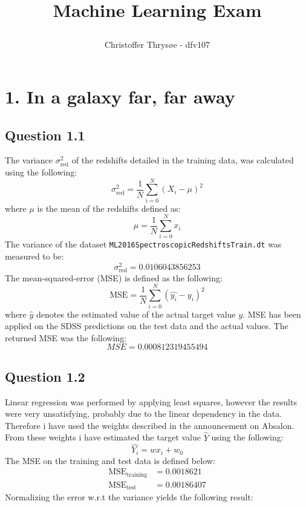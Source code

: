 \documentclass{article}
\title{
\vspace{1in}
\textmd{\textbf{Machine Learning Exam}} \\
\author{Christoffer Thrysøe - dfv107}
}
\begin{document}
\maketitle
{}
\section{1. In a galaxy far, far away}
\subsection{Question 1.1}
The variance $\sigma^ 2_{\text{red}}$ of the redshifts detailed in the training data, was calculated using the following:
\begin{equation}
\sigma^2_{\text{red}} = \dfrac{1}{N} \sum\limits_{i=0}^N(X_i-\mu)^2
\end{equation}
where $\mu$ is the mean of the redshifts defined as:
\begin{equation}
\mu = \dfrac{1}{N} \sum\limits_{i=0}^N x_i
\end{equation}
The variance of the dataset \texttt{ML2016SpectroscopicRedshiftsTrain.dt} was measured to be:
$$
\sigma^ 2_{\text{red}} = 0.0106043856253
$$
The mean-squared-error (MSE) is defined as the following:
\begin{equation}
\text{MSE} = \dfrac{1}{N} \sum\limits_{i=0}^N (\hat{y_i} - y_i)^2 
\end{equation}
where $\hat{y}$ denotes the estimated value of the actual target value $y$. 
MSE has been applied on the SDSS predictions on the test data and the actual values. The returned MSE was the following:
$$
MSE = 0.000812319455494
$$
\subsection{Question 1.2}
Linear regression was performed by applying least squares, however the results were very unsatisfying, probably due to the linear dependency in the data. Therefore i have used the weights described in the announcement on Absalon. From these weights i have estimated the target value $\hat{Y}$ using the following:
\begin{equation}
\hat{Y_i} = wx_i+w_0
\end{equation}
The MSE on the training and test data is defined below:
\begin{align*}
\text{MSE}_{\text{training}} &=  0.0018621 \\
\text{MSE}_{\text{test}} &= 0.00186407
\end{align*}
Normalizing the error w.r.t the variance yields the following result:
\end{document}
